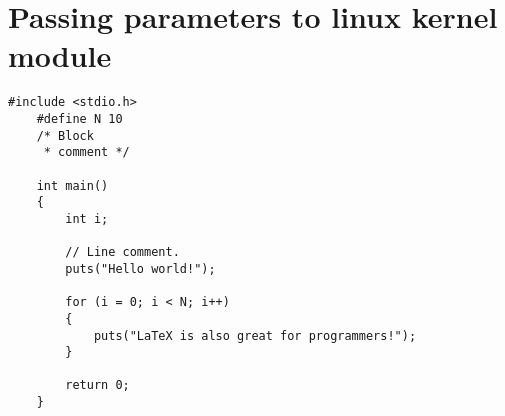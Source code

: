 \section{Passing parameters to linux kernel module}

\begin{lstlisting}[style=CStyle]
    #include <stdio.h>
    #define N 10
    /* Block
     * comment */
    
    int main()
    {
        int i;
    
        // Line comment.
        puts("Hello world!");
        
        for (i = 0; i < N; i++)
        {
            puts("LaTeX is also great for programmers!");
        }
    
        return 0;
    }
\end{lstlisting}


